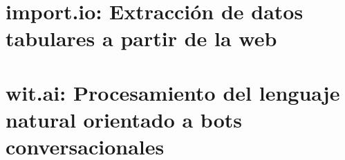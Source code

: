 \chapter{import.io: Extracción de datos tabulares a partir de la web}
\label{anx:importio}

\chapter{wit.ai: Procesamiento del lenguaje natural orientado a bots conversacionales}
\label{anx:witai}




































